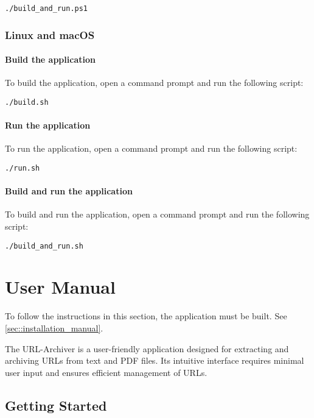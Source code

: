 \begin{lstlisting}
./build_and_run.ps1
\end{lstlisting}

\subsubsection{Linux and macOS}

\paragraph{Build the application}
To build the application, open a command prompt and run the following script:

\begin{lstlisting}
./build.sh
\end{lstlisting}

\paragraph{Run the application}
To run the application, open a command prompt and run the following script:

\begin{lstlisting}
./run.sh
\end{lstlisting}

\paragraph{Build and run the application}
To build and run the application, open a command prompt and run the following script:

\begin{lstlisting}
./build_and_run.sh
\end{lstlisting}


\section{User Manual}
\begin{bfhWarnBox}
	To follow the instructions in this section, the application must be built. See \ref{sec::installation_manual}.
\end{bfhWarnBox}

The URL-Archiver is a user-friendly application designed for extracting and archiving URLs from text and PDF files. Its intuitive interface requires minimal user input and ensures efficient management of URLs.

\subsection{Getting Started}

